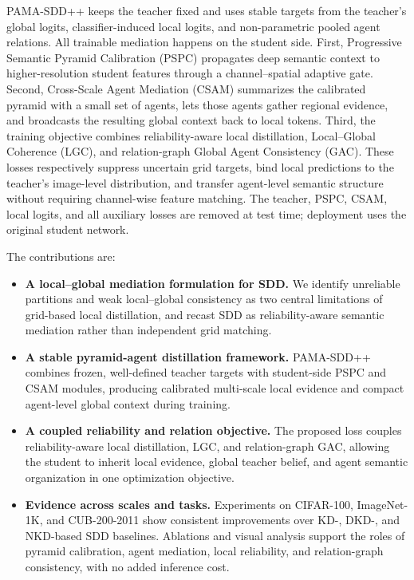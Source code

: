 \documentclass[a4paper,fleqn]{cas-dc}
\begin{document}
PAMA-SDD++ keeps the teacher fixed and uses stable targets from the teacher's
global logits, classifier-induced local logits, and non-parametric pooled
agent relations. All trainable mediation happens on the student side. First,
Progressive Semantic Pyramid Calibration (PSPC) propagates deep semantic
context to higher-resolution student features through a channel--spatial
adaptive gate. Second, Cross-Scale Agent Mediation (CSAM) summarizes the
calibrated pyramid with a small set of agents, lets those agents gather
regional evidence, and broadcasts the resulting global context back to local
tokens. Third, the training objective combines reliability-aware local
distillation, Local--Global Coherence (LGC), and relation-graph Global Agent
Consistency (GAC). These losses respectively suppress uncertain grid targets,
bind local predictions to the teacher's image-level distribution, and transfer
agent-level semantic structure without requiring channel-wise feature matching.
The teacher, PSPC, CSAM, local logits, and all auxiliary losses are removed at
test time; deployment uses the original student network.

The contributions are:
\begin{itemize}
    \item \textbf{A local--global mediation formulation for SDD.} We identify
    unreliable partitions and weak local--global consistency as two central
    limitations of grid-based local distillation, and recast SDD as
    reliability-aware semantic mediation rather than independent grid matching.

    \item \textbf{A stable pyramid-agent distillation framework.} PAMA-SDD++
    combines frozen, well-defined teacher targets with student-side PSPC and
    CSAM modules, producing calibrated multi-scale local evidence and compact
    agent-level global context during training.

    \item \textbf{A coupled reliability and relation objective.} The proposed
    loss couples reliability-aware local distillation, LGC, and relation-graph
    GAC, allowing the student to inherit local evidence, global teacher belief,
    and agent semantic organization in one optimization objective.

    \item \textbf{Evidence across scales and tasks.} Experiments on CIFAR-100,
    ImageNet-1K, and CUB-200-2011 show consistent improvements over KD-, DKD-,
    and NKD-based SDD baselines. Ablations and visual analysis support the
    roles of pyramid calibration, agent mediation, local reliability, and
    relation-graph consistency, with no added inference cost.
\end{itemize}
\end{document}
